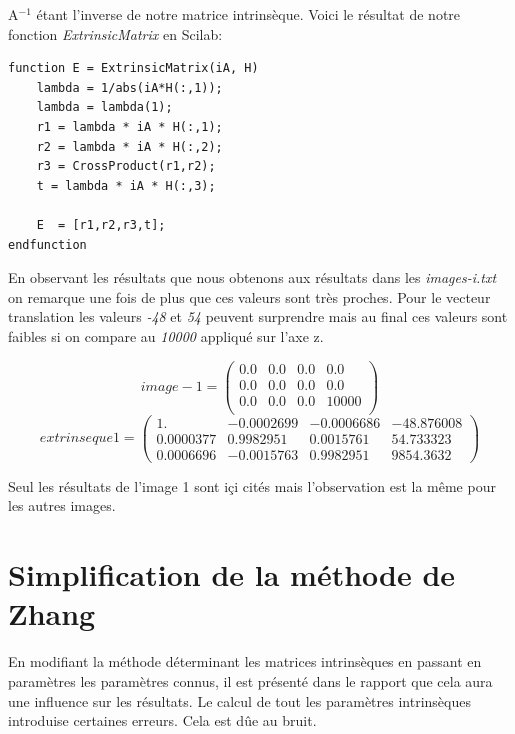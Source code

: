 \documentclass[a4paper,12pt]{report}
\begin{document}
A$^{-1}$ étant l'inverse de notre matrice intrinsèque.
Voici le résultat de notre fonction \textit{ExtrinsicMatrix} en Scilab:

\begin{lstlisting}[style=Scilab]
function E = ExtrinsicMatrix(iA, H)
    lambda = 1/abs(iA*H(:,1));
    lambda = lambda(1);
    r1 = lambda * iA * H(:,1);
    r2 = lambda * iA * H(:,2);
    r3 = CrossProduct(r1,r2);
    t = lambda * iA * H(:,3);

    E  = [r1,r2,r3,t];
endfunction
\end{lstlisting}

En observant les résultats que nous obtenons aux résultats dans les \textit{images-i.txt} on remarque une fois de plus que ces valeurs sont très  proches. Pour le vecteur translation les valeurs \textit{-48} et \textit{54} peuvent surprendre mais au final ces valeurs sont faibles si on compare au \textit{10000} appliqué sur l'axe z.


\begin{center}
\[
	image-1=\left (
	\begin{array}{cccc}
		0.0 & 0.0 & 0.0 & 0.0    \\
		0.0 & 0.0 & 0.0 & 0.0  \\
		0.0 & 0.0 & 0.0 & 10000  \\
	\end{array}
	\right )
\]
\[
	extrinseque1=\left (
	\begin{array}{cccc}
		 1.      &   - 0.0002699 & - 0.0006686 & - 48.876008  \\
    0.0000377  &  0.9982951  &  0.0015761  &  54.733323  \\
    0.0006696 & - 0.0015763  &  0.9982951   & 9854.3632
	\end{array}
	\right )
\]
\end{center}

Seul les résultats de l'image 1 sont içi cités mais l'observation est la même pour les autres images.

\section*{Simplification de la méthode de Zhang}

En modifiant la méthode déterminant les matrices intrinsèques en passant en paramètres les paramètres connus, il est présenté dans le rapport que cela aura une influence sur les résultats. Le calcul de tout les paramètres intrinsèques introduise certaines erreurs. Cela est dûe au bruit.
\end{document}
